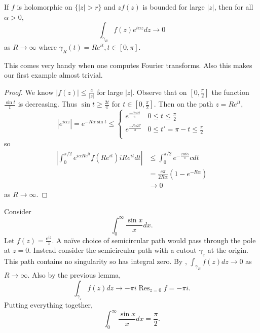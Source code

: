 \documentclass[a4paper]{article}
\DeclareMathOperator*{\res}{Res}
\begin{document}
\begin{lemma}[Jordan]
  \label{lem:Jordan}
  If \(f\) is holomorphic on \(\{|z| > r\}\) and \(zf(z)\) is bounded for large \(|z|\), then for all \(\alpha > 0\),
  \[
    \int_{\gamma_R} f(z)e^{i\alpha z} dz \to 0
  \]
  as \(R \to \infty\) where \(\gamma_R(t) = Re^{it}, t \in [0, \pi]\).
\end{lemma}

This comes very handy when one computes Fourier transforms. Also this makes our first example almost trivial.

\begin{proof}
  We know \(|f(z)| \leq \frac{c}{|z|}\) for large \(|z|\). Observe that on \([0, \frac{\pi}{2}]\) the function \(\frac{\sin t}{t}\) is decreasing. Thus \(\sin t \geq \frac{2t}{\pi}\) for \(t \in [0, \frac{\pi}{2}]\). Then on the path \(z = Re^{it}\),
  \[
    |e^{i\alpha z}| = e^{-R\alpha\sin t} \leq
    \begin{cases}
      e^{\frac{-R\alpha 2t}{\pi}} & 0 \leq t \leq \frac{\pi}{2} \\
      e^{\frac{-R\alpha 2t'}{\pi}} & 0 \leq t' = \pi - t \leq \frac{\pi}{2} \\
    \end{cases}
  \]
so
\begin{align*}
  \left| \int_0^{\pi/2} e^{i\alpha R e^{it}} f(Re^{it}) iRe^{it} dt \right|
  &\leq \int_0^{\pi/2} e^{-\frac{2Rt\alpha}{\pi}}c dt \\
  &= \frac{c\pi}{2R \alpha} (1 - e^{-R \alpha}) \\
  &\to 0
\end{align*}
as \(R \to \infty\).
\end{proof}

\begin{eg}
  Consider
  \[
    \int_0^\infty \frac{\sin x}{x} dx.
  \]
  Let \(f(z) = \frac{e^{iz}}{z}\). A naïve choice of semicircular path would pass through the pole at \(z = 0\). Instead consider the semicircular path with a cutout \(\gamma_\varepsilon\) at the origin. This path contains no singularity so has integral zero. By , \(\int_{\gamma_R} f(z) dz \to 0\) as \(R \to \infty\). Also by the previous lemma,
  \[
    \int_{\gamma_\varepsilon} f(z) dz \to - \pi i \res_{z = 0} f = -\pi i.
  \]
  Putting everything together,
  \[
    \int_0^\infty \frac{\sin x}{x} dx = \frac{\pi}{2}.
  \]
\end{eg}
\end{document}
